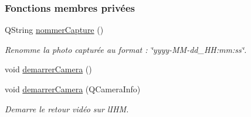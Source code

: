 \subsubsection*{Fonctions membres privées}
\begin{DoxyCompactItemize}
\item 
Q\+String \hyperlink{class_camera_a60d2c9f16b6f235ab6dd0360c883e0d0}{nommer\+Capture} ()
\begin{DoxyCompactList}\small\item\em Renomme la photo capturée au format \+: \char`\"{}yyyy-\/\+M\+M-\/dd\+\_\+\+H\+H\+:mm\+:ss\char`\"{}. \end{DoxyCompactList}\item 
void \hyperlink{class_camera_a181773c87c3deaea9fa9844f8ac294e3}{demarrer\+Camera} ()
\item 
void \hyperlink{class_camera_a7eb23e1a5fe67c61f36b8a97ff1f882c}{demarrer\+Camera} (Q\+Camera\+Info)
\begin{DoxyCompactList}\small\item\em Demarre le retour vidéo sur l\textquotesingle{}I\+HM. \end{DoxyCompactList}\end{DoxyCompactItemize}
